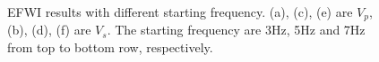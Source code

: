 \begin{figure}[!thb]
   \centering
   \\
   \\
   \\
   \caption{EFWI results with different starting frequency. (a), (c), (e) are $V_p$,
   (b), (d), (f) are $V_s$.
   The starting frequency are 3Hz, 5Hz and 7Hz from top to bottom row, respectively.
   }
   \label{fig:LowFreqCut_EFWI}
\end{figure}
